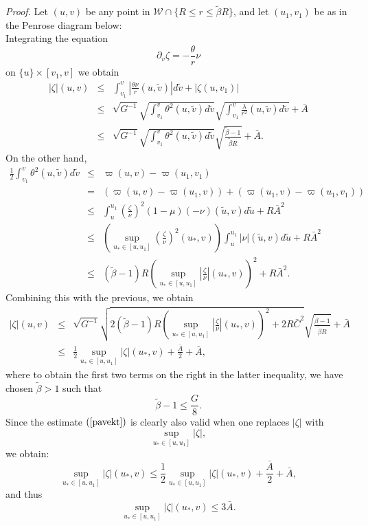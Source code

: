\documentclass{article}
\newcommand{\zn}{\frac{\zeta}{\nu}}
\begin{document}
\noindent\emph{Proof.} Let $(u,v)$ be any point in $\mathcal{W}\cap\{R\le r\le
 \tilde\beta R\}$,
and let $(u_1,v_1)$ be as in the Penrose diagram below:
\[

\]
Integrating the equation
\[
\partial_v\zeta=-\frac{\theta}r\nu
\]
on $\{u\}\times[v_1,v]$
 we obtain
\begin{eqnarray*}    
|\zeta|(u,v)	&\le&  \int_{v_1}^v{\left|\frac{\theta\nu}{r}(u,\tilde{v})\right|
					d\tilde{v}}+
					|\zeta(u,v_1)|\\
		&\le&	\sqrt{G^{-1}}\sqrt{\int_{v_1}^v{\theta^2(u,\tilde{v})d\tilde{v}}}
					\sqrt{\int_{v_1}^v{\frac{\lambda}{r^2}(u,
					\tilde{v})d\tilde{v}}}
					+\bar{A}\\
		&\le&	\sqrt{G^{-1}}\sqrt{\int_{v_1}^v{\theta^2(u,\tilde{v})
					d\tilde{v}}}\sqrt{
					\frac{\tilde{\beta}-1}{\tilde{\beta}R}}
					+\bar{A}.
\end{eqnarray*}
On the other hand,
\begin{eqnarray*}
\frac12\int_{v_1}^v{\theta^2(u,\tilde{v})d\tilde{v}}
					&\le&	\varpi(u,v)-\varpi(u_1,v_1)\\
					& = &	(\varpi(u,v)-\varpi(u_1,v))+
								(\varpi(u_1,v)-
								\varpi(u_1,v_1))\\
					&\le& 	\int_u^{u_1}{\left(\zn\right)^2
								(1-\mu)(-\nu)
								(\tilde{u},v)d\tilde{u}}
								+R \bar{A}^2\\
					&\le&	\left(\sup_{u_*\in[u,u_1]}
								{\left(\zn\right)^2}
								(u_*,v)\right)
								\int_u^{u_1}
								{|\nu|(\tilde{u},v)	
								d\tilde{u}}+R\bar{A}^2\\
					&\le&	(\tilde{\beta}-1)R
							\left(\sup_{u_*\in[u,u_1]}
							{\left|\zn\right|}(u_*,v)
								\right)^2+
								R\bar{A}^2.
\end{eqnarray*}
Combining this with the previous, we obtain
\begin{eqnarray}
\nonumber
\label{pavekt}
|\zeta|(u,v)	&\le&	\sqrt{G^{-1}}\sqrt{2(\tilde{\beta}-1)
					R\left(\sup_{u_*\in[u,u_1]}
					{\left|\zn\right|}(u_*,v)\right)^2+2R\bar{C}^2}
					\sqrt{\frac{\tilde{\beta}-1}{\tilde{\beta}R}}
					+\bar{A}\\
		&\le&	\frac12\sup_{u_*\in[u,u_1]}{|\zeta|(u_*,v)}+
					\frac{\bar{A}}2
					+\bar{A},
\end{eqnarray}
where to obtain the first two terms on the right in the latter inequality,
we have chosen $\tilde{\beta}>1$ such that
\begin{equation}
\label{evab}
\tilde{\beta}-1\le\frac{G}{8}.
\end{equation}
Since the estimate $(\ref{pavekt})$ is clearly also valid when one
replaces $|\zeta|$ with 
\[
\sup_{u_*\in[u,u_1]}{|\zeta|},
\]
we obtain:
\[
\sup_{u_*\in[u,u_1]}{|\zeta|(u_*,v)}\le
\frac12\sup_{u_*\in[u,u_1]}{|\zeta|(u_*,v)}
+\frac{\bar{A}}{2}
+\bar{A},
\]
and
thus
\[
\sup_{u_*\in[u,u_1]}{|\zeta|(u_*,v)}
\le
3\bar{A}.
\]
\end{document}
